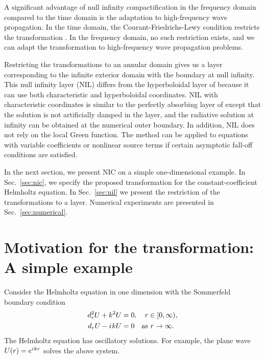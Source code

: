 \documentclass[final,onefignum,onetabnum]{siamart190516}
\newcommand{\iu}{{i\mkern1mu}}
\begin{document}
A significant advantage of null infinity compactification in the frequency domain compared to the time domain is the adaptation to high-frequency wave propagation. In the time domain, the Courant-Friedrichs-Lewy condition restricts the transformation \cite{ZENGINOGLU20112286}. In the frequency domain, no such restriction exists, and we can adapt the transformation to high-frequency wave propagation problems. 

Restricting the transformations to an annular domain gives us a layer corresponding to the infinite exterior domain with the boundary at null infinity. This null infinity layer (NIL) differs from the hyperboloidal layer of \cite{ZENGINOGLU20112286} because it can use both characteristic and hyperboloidal coordinates. NIL with characteristic coordinates is similar to the perfectly absorbing layer of \cite{wang2017perfect, yang2021truly} except that the solution is not artificially damped in the layer, and the radiative solution at infinity can be obtained at the numerical outer boundary. In addition, NIL does not rely on the local Green function. The method can be applied to equations with variable coefficients or nonlinear source terms if certain asymptotic fall-off conditions are satisfied. 

In the next section, we present NIC on a simple one-dimensional example. In Sec.~\ref{sec:nic}, we specify the proposed transformation for the constant-coefficient Helmholtz equation. In Sec.~\ref{sec:nil} we present the restriction of the transformations to a layer. Numerical experiments are presented in Sec.~\ref{sec:numerical}. 

\section{Motivation for the transformation: A simple example}\label{sec:simple}
Consider the Helmholtz equation in one dimension with the Sommerfeld boundary condition 
\begin{align}  
\label {eq:Helmholtz1d} d_r^2 U + k^2 U &= 0, \quad r\in[0,\infty),\\ 
\label{eq:sommerfeld1d}d_r U - \iu k U &= 0 \quad \mathrm{as} \ r\to\infty.
\end{align}
The Helmholtz equation has oscillatory solutions. For example, the plane wave $U(r)=e^{\iu k r}$ solves the above system.
\end{document}
